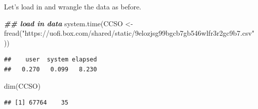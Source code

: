 \documentclass[
  ignorenonframetext,
]{beamer}
\newenvironment{Shaded}{\begin{snugshade}}{\end{snugshade}}
\newcommand{\DocumentationTok}[1]{\textcolor[rgb]{0.56,0.35,0.01}{\textbf{\textit{#1}}}}
\newcommand{\FunctionTok}[1]{\textcolor[rgb]{0.00,0.00,0.00}{#1}}
\newcommand{\NormalTok}[1]{#1}
\newcommand{\OtherTok}[1]{\textcolor[rgb]{0.56,0.35,0.01}{#1}}
\newcommand{\StringTok}[1]{\textcolor[rgb]{0.31,0.60,0.02}{#1}}
\begin{document}
\begin{frame}[fragile]{}
\protect\hypertarget{section}{}
Let's load in and wrangle the data as before.

\tiny

\begin{Shaded}
\begin{Highlighting}[]
\DocumentationTok{\#\# load in data}
\FunctionTok{system.time}\NormalTok{(CCSO }\OtherTok{\textless{}{-}} \FunctionTok{fread}\NormalTok{(}\StringTok{"https://uofi.box.com/shared/static/9elozjsg99bgcb7gb546wlfr3r2gc9b7.csv"}\NormalTok{))}
\end{Highlighting}
\end{Shaded}

\begin{verbatim}
##    user  system elapsed 
##   0.270   0.099   8.230
\end{verbatim}

\begin{Shaded}
\begin{Highlighting}[]
\FunctionTok{dim}\NormalTok{(CCSO)}
\end{Highlighting}
\end{Shaded}

\begin{verbatim}
## [1] 67764    35
\end{verbatim}


\end{frame}
\end{document}
